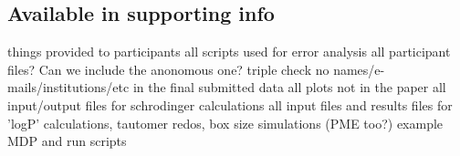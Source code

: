 \subsection{Available in supporting info} %
things provided to participants
all scripts used for error analysis
all participant files? Can we include the anonomous one? 
triple check no names/e-mails/institutions/etc in the final submitted data
all plots not in the paper
all input/output files for schrodinger calculations
all input files and results files for 'logP' calculations, tautomer redos, box size simulations (PME too?) 
example MDP and run scripts
 




%
%




